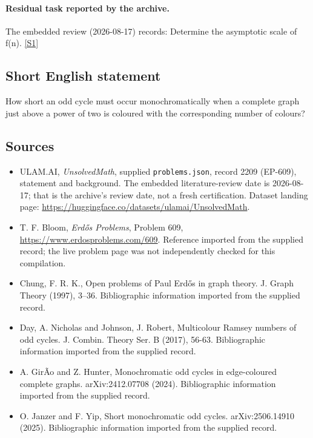 \documentclass[11pt,a4paper]{article}
\newcommand{\sref}[2]{\hyperlink{source:#1:#2}{[S#2]}}
\begin{document}
\paragraph{Residual task reported by the archive.}

The embedded review (2026-08-17) records: Determine the asymptotic scale of f(n). \sref{2209}{1}

\subsection{Short English statement}

How short an odd cycle must occur monochromatically when a complete graph just above a power of two is coloured with the corresponding number of colours?

\subsection{Sources}

{\small

\begin{itemize}

\item[\hypertarget{source:2209:1}{S1}] ULAM.AI, \emph{UnsolvedMath}, supplied \texttt{problems.json}, record 2209 (EP-609), statement and background. The embedded literature-review date is 2026-08-17; that is the archive’s review date, not a fresh certification. Dataset landing page: \url{https://huggingface.co/datasets/ulamai/UnsolvedMath}.

\item[\hypertarget{source:2209:2}{S2}] T. F. Bloom, \emph{Erdős Problems}, Problem 609, \url{https://www.erdosproblems.com/609}. Reference imported from the supplied record; the live problem page was not independently checked for this compilation.

\item[\hypertarget{source:2209:3}{S3}] Chung, F. R. K., Open problems of {P}aul Erd\H{o}s in graph theory. J. Graph Theory (1997), 3--36. Bibliographic information imported from the supplied record.

\item[\hypertarget{source:2209:4}{S4}] Day, A. Nicholas and Johnson, J. Robert, Multicolour Ramsey numbers of odd cycles. J. Combin. Theory Ser. B (2017), 56-63. Bibliographic information imported from the supplied record.

\item[\hypertarget{source:2209:5}{S5}] A. Gir\~Ao and Z. Hunter, Monochromatic odd cycles in edge-coloured complete graphs. arXiv:2412.07708 (2024). Bibliographic information imported from the supplied record.

\item[\hypertarget{source:2209:6}{S6}] O. Janzer and F. Yip, Short monochromatic odd cycles. arXiv:2506.14910 (2025). Bibliographic information imported from the supplied record.

\end{itemize}

}

\label{end:2209}
\end{document}
